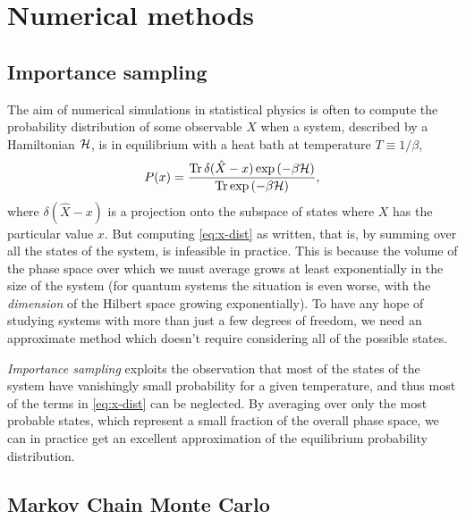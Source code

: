 \chapter{Numerical methods}
\label{chap:numerical}


%


\section{Importance sampling}

The aim of numerical simulations in statistical physics is often to compute the
probability distribution of some observable $X$ when a system, described by a
Hamiltonian $\mathcal{H}$, is in equilibrium with a heat bath at temperature $T \equiv
1/\beta$,
\begin{equation}
  P(x) =
  \frac{\operatorname{Tr} \delta(\hat{X}-x)\exp\left(-\beta \mathcal{H}\right)}
       {\operatorname{Tr} \exp\left(-\beta \mathcal{H}\right)},
  \label{eq:x-dist}
\end{equation}
where $\delta(\hat{X}-x)$ is a projection onto the subspace of states where $X$
has the particular value $x$. But computing \cref{eq:x-dist} as written, that
is, by summing over all the states of the system, is infeasible in practice.
This is because the volume of the phase space over which we must average grows
at least exponentially in the size of the system (for quantum systems the
situation is even worse, with the \emph{dimension} of the Hilbert space growing
exponentially). To have any hope of studying systems with more than just a few
degrees of freedom, we need an approximate method which doesn't require
considering all of the possible states.

\emph{Importance sampling} exploits the observation that most of the states of
the system have vanishingly small probability for a given temperature, and thus
most of the terms in \cref{eq:x-dist} can be neglected. By averaging over only
the most probable states, which represent a small fraction of the overall phase
space, we can in practice get an excellent approximation of the equilibrium
probability distribution.


\section{Markov Chain Monte Carlo}

